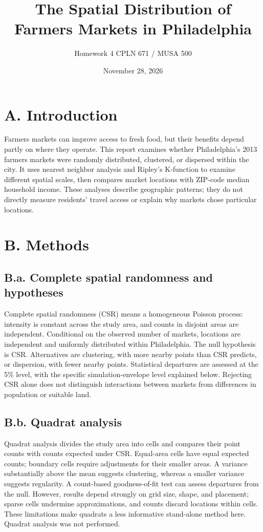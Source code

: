 \documentclass[
  10pt,
]{article}
\title{The Spatial Distribution of Farmers Markets in Philadelphia}
\subtitle{Homework 4 \textbar{} CPLN 671 / MUSA 500}
\author{}
\date{\vspace{-2.5em}November 28, 2026}
\begin{document}
\maketitle

\section{A. Introduction}\label{a.-introduction}

Farmers markets can improve access to fresh food, but their benefits
depend partly on where they operate. This report examines whether
Philadelphia's 2013 farmers markets were randomly distributed,
clustered, or dispersed within the city. It uses nearest neighbor
analysis and Ripley's K-function to examine different spatial scales,
then compares market locations with ZIP-code median household income.
These analyses describe geographic patterns; they do not directly
measure residents' travel access or explain why markets chose particular
locations.

\section{B. Methods}\label{b.-methods}

\subsection{B.a. Complete spatial randomness and
hypotheses}\label{b.a.-complete-spatial-randomness-and-hypotheses}

Complete spatial randomness (CSR) means a homogeneous Poisson process:
intensity is constant across the study area, and counts in disjoint
areas are independent. Conditional on the observed number of markets,
locations are independent and uniformly distributed within Philadelphia.
The null hypothesis is CSR. Alternatives are clustering, with more
nearby points than CSR predicts, or dispersion, with fewer nearby
points. Statistical departures are assessed at the 5\% level, with the
specific simulation-envelope level explained below. Rejecting CSR alone
does not distinguish interactions between markets from differences in
population or suitable land.

\subsection{B.b. Quadrat analysis}\label{b.b.-quadrat-analysis}

Quadrat analysis divides the study area into cells and compares their
point counts with counts expected under CSR. Equal-area cells have equal
expected counts; boundary cells require adjustments for their smaller
areas. A variance substantially above the mean suggests clustering,
whereas a smaller variance suggests regularity. A count-based
goodness-of-fit test can assess departures from the null. However,
results depend strongly on grid size, shape, and placement; sparse cells
undermine approximations, and counts discard locations within cells.
These limitations make quadrats a less informative stand-alone method
here. Quadrat analysis was not performed.
\end{document}
